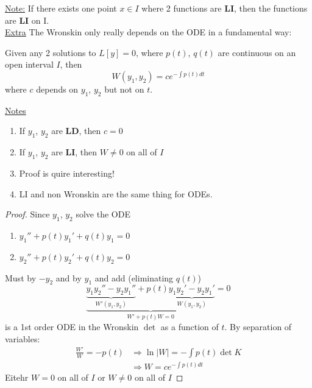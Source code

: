 \underline{Note:} If there exists one point $x \in I$ where 2 functions are \textbf{LI}, then the functions are \textbf{LI} on I.\\
\underline{Extra} The Wronskin only really depends on the ODE in a fundamental way:
\begin{theorem}
	Given any 2 solutions to $L[y] = 0$, where $p(t)$, $q(t)$ are continuous on an open interval $I$, then
	\begin{equation*}
		W(y_1, y_2) = ce^{-\int p(t) dt}
	\end{equation*}
	where $c$ depends on $y_1$, $y_2$ but not on $t$.
\end{theorem}
\underline{Notes}
\begin{enumerate}[label=\protect\circled{\Roman*}]
	\item If $y_1$, $y_2$ are \textbf{LD}, then $c=0$
	\item If $y_1$, $y_2$ are \textbf{LI}, then $W \neq 0$ on all of $I$
	\item Proof is quire interesting!
	\item LI and non Wronskin are the same thing for ODEs.
\end{enumerate}
\begin{proof}
	Since $y_1$, $y_2$ solve the ODE
	\begin{enumerate}[label=\protect\circled{\alph*}]
		\setlength\itemindent{25pt} \item $y_1'' + p(t)y_1' + q(t)y_1 = 0$
		\item $y_2'' + p(t)y_2' + q(t)y_2 = 0$
	\end{enumerate}
	Must  by $-y_2$ and  by $y_1$ and add (eliminating $q(t)$)
	\begin{equation*}
		\underbrace{\underbrace{y_1 y_2'' - y_2 y_1''}_{W'(y_1, y_2)} + p(t) \underbrace{y_1 y_2' - y_2 y_1'}_{W(y_1, y_2)}}_{W' + p(t)W = 0} = 0
	\end{equation*}
	is a 1st order ODE in the Wronskin $\det$ as a function of $t$. By separation of variables:
	\begin{align*}
		\frac{W'}{W} = -p(t) & \Rightarrow \ln |W| = - \int p(t) \det K\\
		& \Rightarrow W = ce^{-\int p(t) dt}
	\end{align*}
	Eitehr $W = 0$ on all of $I$ or $W \neq 0$ on all of $I$
\end{proof}
